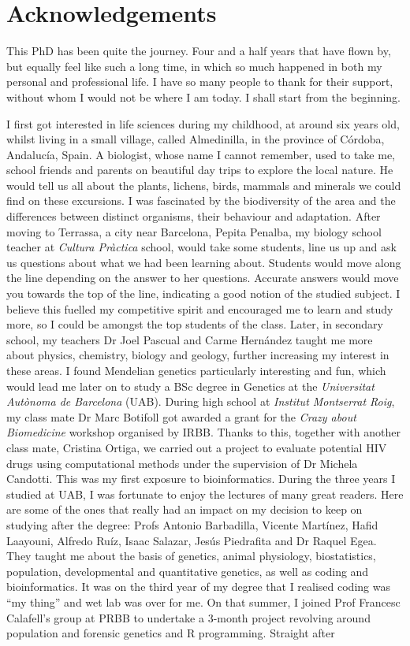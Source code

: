 \chapter*{Acknowledgements} %

This PhD has been quite the journey. Four and a half years that have flown by, but equally feel like such a long time, in which so much happened in both my personal and professional life. I have so many people to thank for their support, without whom I would not be where I am today. I shall start from the beginning.

I first got interested in life sciences during my childhood, at around six years old, whilst living in a small village, called Almedinilla, in the province of Córdoba, Andalucía, Spain. A biologist, whose name I cannot remember, used to take me, school friends and parents on beautiful day trips to explore the local nature. He would tell us all about the plants, lichens, birds, mammals and minerals we could find on these excursions. I was fascinated by the biodiversity of the area and the differences between distinct organisms, their behaviour and adaptation. After moving to Terrassa, a city near Barcelona, Pepita Penalba, my biology school teacher at \textit{Cultura Pràctica} school, would take some students, line us up and ask us questions about what we had been learning about. Students would move along the line depending on the answer to her questions. Accurate answers would move you towards the top of the line, indicating a good notion of the studied subject. I believe this fuelled my competitive spirit and encouraged me to learn and study more, so I could be amongst the top students of the class. Later, in secondary school, my teachers Dr Joel Pascual and Carme Hernández taught me more about physics, chemistry, biology and geology, further increasing my interest in these areas. I found Mendelian genetics particularly interesting and fun, which would lead me later on to study a BSc degree in Genetics at the \textit{Universitat Autònoma de Barcelona} (UAB). During high school at \textit{Institut Montserrat Roig}, my class mate Dr Marc Botifoll got awarded a grant for the \textit{Crazy about Biomedicine} workshop organised by IRBB. Thanks to this, together with another class mate, Cristina Ortiga, we carried out a project to evaluate potential HIV drugs using computational methods under the supervision of Dr Michela Candotti. This was my first exposure to bioinformatics. During the three years I studied at UAB, I was fortunate to enjoy the lectures of many great readers. Here are some of the ones that really had an impact on my decision to keep on studying after the degree: Profs Antonio Barbadilla, Vicente Martínez, Hafid Laayouni, Alfredo Ruíz, Isaac Salazar, Jesús Piedrafita and Dr Raquel Egea. They taught me about the basis of genetics, animal physiology, biostatistics, population, developmental and quantitative genetics, as well as coding and bioinformatics. It was on the third year of my degree that I realised coding was ``my thing'' and wet lab was over for me. On that summer, I joined Prof Francesc Calafell's group at PRBB to undertake a 3-month project revolving around population and forensic genetics and R programming. Straight after 